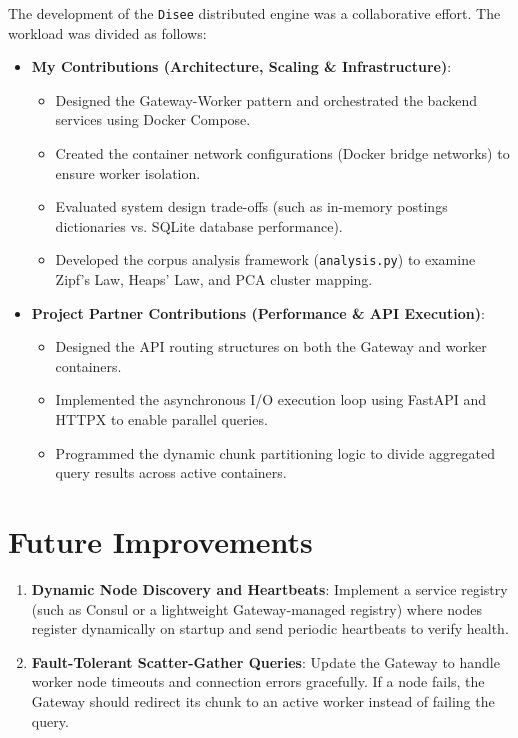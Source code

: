 \documentclass[11pt,a4paper]{article}
\begin{document}
\begin{itemize}
The development of the \texttt{Disee} distributed engine was a collaborative effort. The workload was divided as follows:
\begin{itemize}
    \item \textbf{My Contributions (Architecture, Scaling \& Infrastructure)}:
    \begin{itemize}
        \item Designed the Gateway-Worker pattern and orchestrated the backend services using Docker Compose.
        \item Created the container network configurations (Docker bridge networks) to ensure worker isolation.
        \item Evaluated system design trade-offs (such as in-memory postings dictionaries vs. SQLite database performance).
        \item Developed the corpus analysis framework (\texttt{analysis.py}) to examine Zipf's Law, Heaps' Law, and PCA cluster mapping.
    \end{itemize}
    \item \textbf{Project Partner Contributions (Performance \& API Execution)}:
    \begin{itemize}
        \item Designed the API routing structures on both the Gateway and worker containers.
        \item Implemented the asynchronous I/O execution loop using FastAPI and HTTPX to enable parallel queries.
        \item Programmed the dynamic chunk partitioning logic to divide aggregated query results across active containers.
    \end{itemize}
\end{itemize}

\section{Future Improvements}

\begin{enumerate}
    \item \textbf{Dynamic Node Discovery and Heartbeats}:
    Implement a service registry (such as Consul or a lightweight Gateway-managed registry) where nodes register dynamically on startup and send periodic heartbeats to verify health.
    
    \item \textbf{Fault-Tolerant Scatter-Gather Queries}:
    Update the Gateway to handle worker node timeouts and connection errors gracefully. If a node fails, the Gateway should redirect its chunk to an active worker instead of failing the query.
    

\end{enumerate}
\end{itemize}
\end{document}
